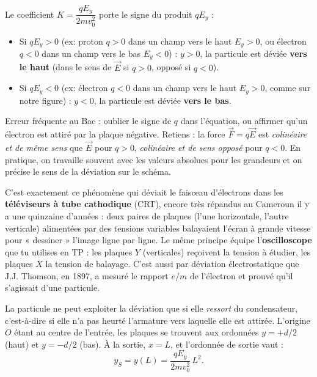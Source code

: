 \documentclass[11pt]{article}
\newcounter{popsec}
\newcounter{popsub}
\newcommand{\courssub}[1]{%
  \stepcounter{popsub}%
  \par\vspace{9pt}\noindent{\popxbold\fontsize{11.5}{13}\selectfont\color{popink}{\color{poporange}\thepopsec.\thepopsub}\hspace{6pt}#1}\par\nopagebreak\vspace{4pt}
}
\begin{document}
\begin{attention}
Le coefficient $K = \dfrac{q E_y}{2mv_0^2}$ porte le signe du produit $q E_y$ :
\begin{itemize}
\item Si $q E_y > 0$ (ex: proton $q>0$ dans un champ vers le haut $E_y>0$, ou électron $q<0$ dans un champ vers le bas $E_y<0$) : $y > 0$, la particule est déviée \textbf{vers le haut} (dans le sens de $\vec{E}$ si $q>0$, opposé si $q<0$).
\item Si $q E_y < 0$ (ex: électron $q<0$ dans un champ vers le haut $E_y>0$, comme sur notre figure) : $y < 0$, la particule est déviée \textbf{vers le bas}.
\end{itemize}
Erreur fréquente au Bac : oublier le signe de $q$ dans l'équation, ou affirmer qu'un électron est attiré par la plaque négative. Retiens : la force $\vec{F} = q\vec{E}$ est \emph{colinéaire et de même sens} que $\vec{E}$ pour $q>0$, \emph{colinéaire et de sens opposé} pour $q<0$. En pratique, on travaille souvent avec les valeurs absolues pour les grandeurs et on précise le sens de la déviation sur le schéma.
\end{attention}

\begin{savaistu}
C'est exactement ce phénomène qui déviait le faisceau d'électrons dans les \textbf{téléviseurs à tube cathodique} (CRT), encore très répandus au Cameroun il y a une quinzaine d'années : deux paires de plaques (l'une horizontale, l'autre verticale) alimentées par des tensions variables balayaient l'écran à grande vitesse pour « dessiner » l'image ligne par ligne. Le même principe équipe l'\textbf{oscilloscope} que tu utilises en TP : les plaques $Y$ (verticales) reçoivent la tension à étudier, les plaques $X$ la tension de balayage. C'est aussi par déviation électrostatique que J.J. Thomson, en 1897, a mesuré le rapport $e/m$ de l'électron et prouvé qu'il s'agissait d'une particule.
\end{savaistu}

\courssub{Condition de sortie des plaques}

La particule ne peut exploiter la déviation que si elle \emph{ressort} du condensateur, c'est-à-dire si elle n'a pas heurté l'armature vers laquelle elle est attirée. L'origine $O$ étant au centre de l'entrée, les plaques se trouvent aux ordonnées $y = +d/2$ (haut) et $y = -d/2$ (bas). À la sortie, $x = L$, et l'ordonnée de sortie vaut :
\[ y_S = y(L) = \frac{q E_y}{2mv_0^2}\,L^2. \]
\end{document}

